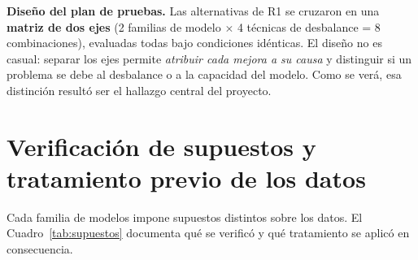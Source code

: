 \documentclass[11pt,a4paper]{article}
\begin{document}
\noindent\textbf{Diseño del plan de pruebas.} Las alternativas de R1 se
cruzaron en una \textbf{matriz de dos ejes} (2 familias de modelo $\times$ 4
técnicas de desbalance = 8 combinaciones), evaluadas todas bajo condiciones
idénticas. El diseño no es casual: separar los ejes permite \emph{atribuir
cada mejora a su causa} y distinguir si un problema se debe al desbalance o a
la capacidad del modelo. Como se verá, esa distinción resultó ser el hallazgo
central del proyecto.

\section{Verificación de supuestos y tratamiento previo de los datos}

Cada familia de modelos impone supuestos distintos sobre los datos. El
Cuadro~\ref{tab:supuestos} documenta qué se verificó y qué tratamiento se
aplicó en consecuencia.
\end{document}
